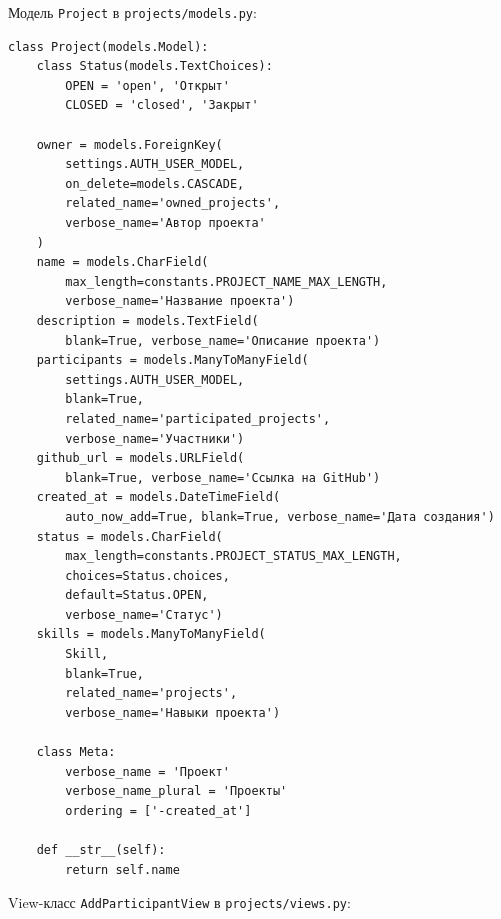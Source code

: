 \documentclass[bachelor, och, pract]{../SCWorks}
\begin{document}
Модель \texttt{Project} в \texttt{projects/models.py}:

\begin{lstlisting}
class Project(models.Model):
    class Status(models.TextChoices):
        OPEN = 'open', 'Открыт'
        CLOSED = 'closed', 'Закрыт'

    owner = models.ForeignKey(
        settings.AUTH_USER_MODEL,
        on_delete=models.CASCADE,
        related_name='owned_projects',
        verbose_name='Автор проекта'
    )
    name = models.CharField(
        max_length=constants.PROJECT_NAME_MAX_LENGTH,
        verbose_name='Название проекта')
    description = models.TextField(
        blank=True, verbose_name='Описание проекта')
    participants = models.ManyToManyField(
        settings.AUTH_USER_MODEL,
        blank=True,
        related_name='participated_projects',
        verbose_name='Участники')
    github_url = models.URLField(
        blank=True, verbose_name='Ссылка на GitHub')
    created_at = models.DateTimeField(
        auto_now_add=True, blank=True, verbose_name='Дата создания')
    status = models.CharField(
        max_length=constants.PROJECT_STATUS_MAX_LENGTH,
        choices=Status.choices,
        default=Status.OPEN,
        verbose_name='Статус')
    skills = models.ManyToManyField(
        Skill,
        blank=True,
        related_name='projects',
        verbose_name='Навыки проекта')

    class Meta:
        verbose_name = 'Проект'
        verbose_name_plural = 'Проекты'
        ordering = ['-created_at']

    def __str__(self):
        return self.name
\end{lstlisting}

View-класс \texttt{AddParticipantView} в \texttt{projects/views.py}:
\end{document}

